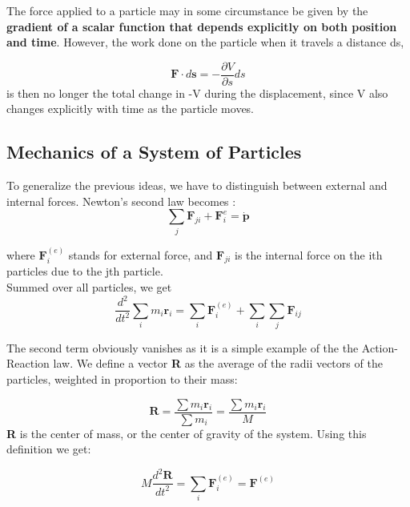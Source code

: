 \documentclass{article}
\begin{document}
The force applied to a particle may in some circumstance be given by the \textbf{gradient of a scalar function that depends explicitly on both position and time}.
However, the work done on the particle when it travels a distance ds, 

\begin{equation}
\textbf{F} \cdot d\textbf{s} = -\frac{\partial V}{\partial s} ds
\end{equation}
is then no longer the total change in -V during the displacement, since V also changes explicitly with time as the particle moves.


\subsection{Mechanics of a System of Particles}

To generalize the previous ideas, we have to distinguish between external and internal forces. Newton's second law becomes :
\\
\begin{equation*}
    \sum\limits_j \textbf{F}_{ji} + \textbf{F}^{e}_i = \dot{\textbf{p}}
\end{equation*}

where $\textbf{F}^{(e)}_i$ stands for external force, and $\textbf{F}_{ji}$ is the internal force on the ith particles due to the jth particle. \\

Summed over all particles, we get 
\\
\begin{equation*}
    \frac{d^2}{dt^2}\sum\limits_i m_i\textbf{r}_i = \sum\limits_{i} \textbf{F}^{(e)}_i + \sum\limits_i \sum\limits_{j} \textbf{F}_{ij}
\end{equation*}

The second term obviously vanishes as it is a simple example of the the Action-Reaction law. We define a vector \textbf{R} as the average of the radii vectors of the particles, weighted in proportion to their mass:

\begin{equation*}
    \textbf{R} = \frac{\sum m_i\textbf{r}_i}{\sum m_i} = \frac{\sum m_i\textbf{r}_i}{M}
\end{equation*}
\textbf{R} is the center of mass, or the center of gravity of the system. Using this definition we get:

\begin{equation*}
    M \frac{d^2 \textbf{R}}{dt^2} = \sum\limits_i\textbf{F}^{(e)}_i = \textbf{F}^{(e)}   
\end{equation*}
\end{document}
